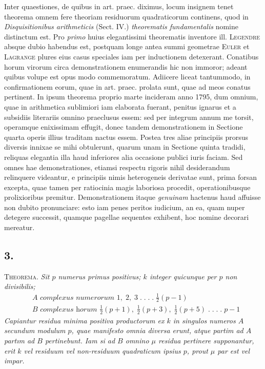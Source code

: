 \documentclass[14pt]{memoir}
\begin{document}
Inter quaestiones, de quibus in art. praec. diximus, locum insignem tenet theorema omnem fere theoriam residuorum quadraticorum continens, quod in \textit{Disquisitionibus arithmeticis} (Sect. IV.) \textit{theorematis fundamentalis} nomine distinctum %
est. Pro \textit{primo} huius elegantissimi theorematis inventore ill. \textsc{Legendre} absque dubio habendus est, postquam longe antea summi geometrae \textsc{Euler} et \textsc{Lagrange} plures eius casus speciales iam per inductionem detexerant. Conatibus horum virorum circa demonstrationem enumerandis hic non immoror; adeant quibus volupe est opus modo commemoratum. Adiicere liceat tantummodo, in confirmationem eorum, quae in art. praec. prolata sunt, quae ad meos conatus pertinent. In ipsum theorema proprio marte incideram anno 1795, dum omnium, quae in arithmetica sublimiori iam elaborata fuerant, penitus ignarus et a subsidiis literariis omnino praeclusus essem: sed per integrum annum me torsit, operamque enixissimam effugit, donec tandem demonstrationem in Sectione quarta operis illius traditam nactus essem. Postea tres aliae principiis prorsus diversis innixae se mihi obtulerunt, quarum unam in Sectione quinta tradidi, reliquas elegantia illa haud inferiores alia occasione publici iuris faciam. Sed omnes hae demonstrationes, etiamsi respectu rigoris nihil desiderandum relinquere videantur, e principiis nimis heterogeneis derivatae sunt, prima forsan excepta, quae tamen per ratiocinia magis laboriosa procedit, operationibusque prolixioribus premitur. Demonstrationem itaque \textit{genuinam} hactenus haud affuisse non dubito pronunciare: esto iam penes peritos iudicium, an ea, quam nuper detegere successit, quamque pagellae sequentes exhibent, hoc nomine decorari mereatur. 

\subsection*{3.}
 
\textsc{Theorema}. \textit{Sit \(p\) numerus primus positivus; \(k\) integer quicunque per \(p\) non divisibilis;
\begin{align*} 
&A \textit{ complexus numerorum } 1,\;2,\;3\;.\;.\;.\;.\;\tfrac{1}{2}(p-1)  \\
&B \textit{ complexus horum } \tfrac{1}{2}(p+1),\; \tfrac{1}{2}(p+3),\;\tfrac{1}{2}(p+5)\;.\;.\;.\;.\; p-1 
\end{align*}
Capiantur residua minima positiva productorum ex \(k\) in singulos numeros \(A\) secundum modulum \(p\), quae manifesto omnia diversa erunt, atque partim ad \(A\) partım ad \(B\) pertinebunt. Iam si ad \(B\) omnino \(\mu\) residua pertinere supponantur, erit \(k\) vel residuum vel non-residuum quadraticum ipsius \(p\), prout \(\mu\) par est vel impar.}
\end{document}
